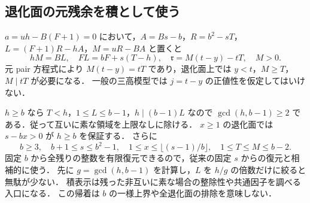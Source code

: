 \subsection{退化面の元残余を積として使う}
\label{ndg25:section}
$a=uh-B(F+1)=0$ において，$A=Bs-b$，$R=b^2-sT$，
$L=(F+1)R-hA$，$M=uR-BA$ と置くと
\[
 hM=BL,\quad FL=bF+s(T-h),\quad
 \mathfrak r=M(t-y)-tT,\quad M>0.
\]
元 pair 方程式により $M(t-y)=tT$ であり，退化面上では $y<t$，$M\ge T$，$M\mid tT$ が必要になる．
一般の三高模型では $j=t-y$ の正値性を仮定してはいけない．

$h\ge b$ なら $T<h$，$1\le L\le b-1$，$h\mid(b-1)L$ なので
$\gcd(h,b-1)\ge2$ である．従って互いに素な領域を上限なしに除ける．
$x\ge1$ の退化面では $s-bx>0$ が $h\ge b$ を保証する．
さらに
\[
 b\ge3,\quad b+1\le s\le b^2-1,\quad
 1\le x\le\lfloor(s-1)/b\rfloor,\quad 1\le T\le M\le b-2.
\]
固定 $b$ から全残りの整数を有限復元できるので，従来の固定 $s$ からの復元と相補的に使う．
先に $g=\gcd(h,b-1)$ を計算し，$L$ を $h/g$ の倍数だけに絞ると無駄が少ない．
積表示は残った非互いに素な場合の整除性や共通因子を調べる入口になる．
この帰着は $b$ の一様上界や全退化面の排除を意味しない．
